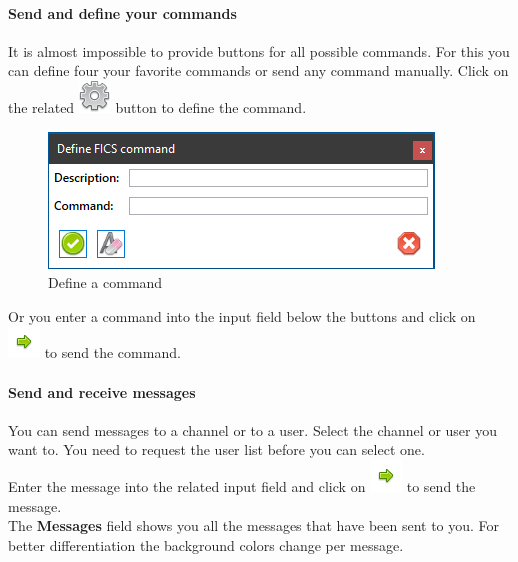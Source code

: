 \documentclass[11pt,a4paper]{article}
\begin{document}
\paragraph{Send and define your commands}
It is almost impossible to provide buttons for all possible commands. For this you can define four your favorite commands or send any command manually.
Click on the related \includegraphics[scale=0.3]{cog.png} button to define the command.
\begin{figure}[H]
	\centering
	\includegraphics[scale=1.0]{fics5.png}
	\caption{Define a command}
	\label{fig:ficsDefimeCpommand}
\end{figure}

Or you enter a command into the input field below the buttons and click on \includegraphics[scale=0.5]{bullet_go.png} to send the command.

\paragraph{Send and receive messages}
You can send messages to a channel or to a user. Select the channel or user you want to.
You need to request the user list before you can select one.\\
Enter the message into the related input field and click on \includegraphics[scale=0.5]{bullet_go.png} to send the message.\\
The \textbf{Messages} field shows you all the messages that have been sent to you. For better differentiation the background colors change per message.
\end{document}
